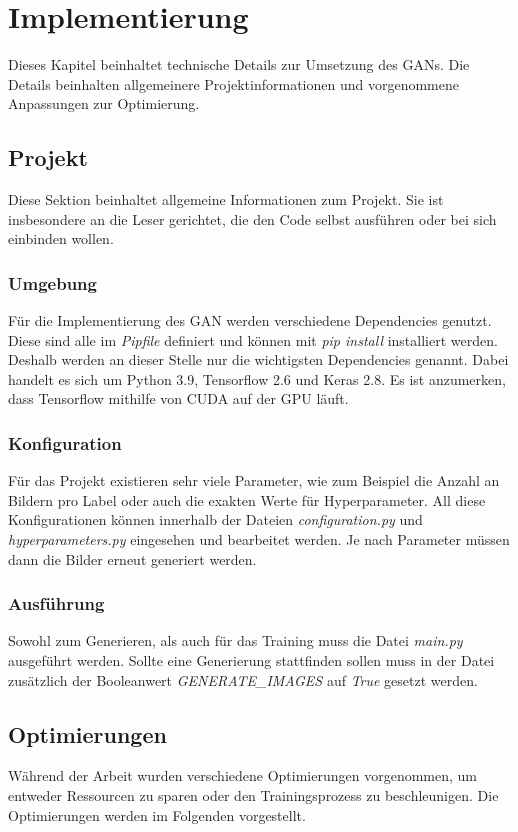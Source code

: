 
\chapter{Implementierung}
Dieses Kapitel beinhaltet technische Details zur Umsetzung des GANs.
Die Details beinhalten allgemeinere Projektinformationen und vorgenommene Anpassungen zur Optimierung.

\section{Projekt}
Diese Sektion beinhaltet allgemeine Informationen zum Projekt.
Sie ist insbesondere an die Leser gerichtet, die den Code selbst ausführen oder bei sich einbinden wollen.

\subsection{Umgebung}
Für die Implementierung des GAN werden verschiedene Dependencies genutzt.
Diese sind alle im \textit{Pipfile} definiert und können mit \textit{pip install} installiert werden.
Deshalb werden an dieser Stelle nur die wichtigsten Dependencies genannt.
Dabei handelt es sich um Python 3.9, Tensorflow 2.6 und Keras 2.8.
Es ist anzumerken, dass Tensorflow mithilfe von CUDA auf der GPU läuft.

\subsection{Konfiguration}
Für das Projekt existieren sehr viele Parameter, wie zum Beispiel die Anzahl an Bildern pro Label oder auch die exakten Werte für Hyperparameter.
All diese Konfigurationen können innerhalb der Dateien \textit{configuration.py} und \textit{hyperparameters.py} eingesehen und bearbeitet werden.
Je nach Parameter müssen dann die Bilder erneut generiert werden.

\subsection{Ausführung}
Sowohl zum Generieren, als auch für das Training muss die Datei \textit{main.py} ausgeführt werden.
Sollte eine Generierung stattfinden sollen muss in der Datei zusätzlich der Booleanwert \textit{GENERATE\_IMAGES} auf \textit{True} gesetzt werden.

\section{Optimierungen}
Während der Arbeit wurden verschiedene Optimierungen vorgenommen, um entweder Ressourcen zu sparen oder den Trainingsprozess zu beschleunigen.
Die Optimierungen werden im Folgenden vorgestellt.


